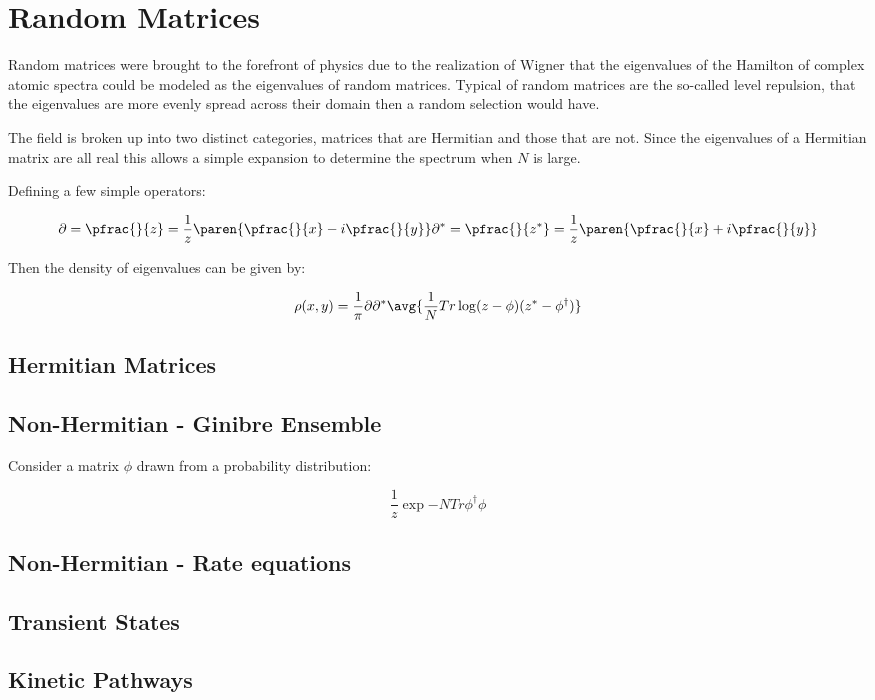 \section{Random Matrices}

Random matrices were brought to the forefront of physics due to the realization of Wigner that the eigenvalues of the Hamilton of complex atomic spectra could be modeled as the eigenvalues of random matrices. Typical  of random matrices are the so-called level repulsion, that the eigenvalues are more evenly spread across their domain then a random selection would have.

The field is broken up into two distinct categories, matrices that are Hermitian and those that are not. Since the eigenvalues of a Hermitian matrix are all real this allows a simple expansion to determine the spectrum when $N$ is large.

Defining a few simple operators:

\begin{equation}
  \partial    = \pfrac{}{z}   = \frac{1}{z} \paren{ \pfrac{}{x} - i \pfrac{}{y} }
  \partial^* = \pfrac{}{z^*} = \frac{1}{z} \paren{ \pfrac{}{x} + i \pfrac{}{y} }
\end{equation}

Then the density of eigenvalues can be given by:

\begin{equation}
  \rho(x,y) = \frac{1}{\pi} \partial \partial ^* 
  \avg{ \frac{1}{N} Tr \log (z-\phi)(z^* -\phi^ \dagger) }
\end{equation}



\subsection{Hermitian Matrices}

\subsection{Non-Hermitian - Ginibre Ensemble}
Consider a matrix $\phi$ drawn from a probability distribution:

\begin{equation}
  \frac{1}{z} \exp{ -N Tr \phi^ \dagger \phi  }
\end{equation}

\subsection{Non-Hermitian - Rate equations}



\subsection{Transient States}
\subsection{Kinetic Pathways}
